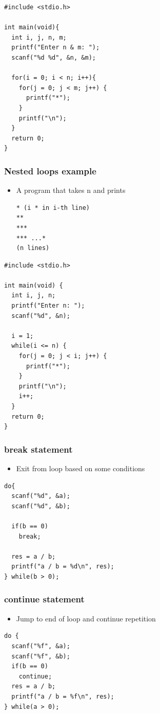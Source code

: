 \documentclass{../c-lecture}
\begin{document}
\begin{frame}[fragile]
  \begin{verbatim}
#include <stdio.h>

int main(void){
  int i, j, n, m;
  printf("Enter n & m: ");
  scanf("%d %d", &n, &m);

  for(i = 0; i < n; i++){
    for(j = 0; j < m; j++) {
      printf("*");
    }
    printf("\n");
  }
  return 0;
}
  \end{verbatim}
\end{frame}

\begin{frame}[fragile]
  \frametitle{Nested loops example}
  \begin{itemize}
    \item A program that takes n and prints
    \begin{verbatim}
* (i * in i-th line)
**
***
*** ...*
(n lines)
    \end{verbatim}
  \end{itemize}
\end{frame}

\begin{frame}[fragile]
  \begin{verbatim}
#include <stdio.h>

int main(void) {
  int i, j, n;
  printf("Enter n: ");
  scanf("%d", &n);

  i = 1;
  while(i <= n) {
    for(j = 0; j < i; j++) {
      printf("*");
    }
    printf("\n");
    i++;
  }
  return 0;
}
  \end{verbatim}
\end{frame}

\begin{frame}[fragile]
  \frametitle{break statement}
  \begin{itemize}
    \item Exit from loop based on some conditions
  \end{itemize}
  \begin{verbatim}
do{
  scanf("%d", &a);
  scanf("%d", &b);

  if(b == 0)
    break;

  res = a / b;
  printf("a / b = %d\n", res);
} while(b > 0);
  \end{verbatim}
\end{frame}

\begin{frame}[fragile]
  \frametitle{continue statement}
  \begin{itemize}
    \item Jump to end of loop and continue repetition
  \end{itemize}
  \begin{verbatim}
do {
  scanf("%f", &a);
  scanf("%f", &b);
  if(b == 0)
    continue;
  res = a / b;
  printf("a / b = %f\n", res);
} while(a > 0);
  \end{verbatim}
\end{frame}
\end{document}
